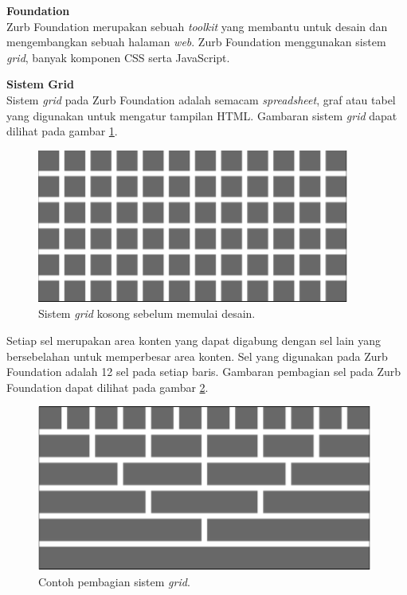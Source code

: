 \documentclass[a4paper,twoside]{article}
\begin{document}
\begin{enumerate}
\begin{lstlisting}[caption=Menambahkan vektor pada peta,label = {lst_2_ol_map},language=Java]
\end{lstlisting}

\textbf{Foundation}\\

Zurb Foundation \cite{zurbfoundationbook} merupakan sebuah \textit{toolkit} yang membantu untuk desain dan mengembangkan sebuah halaman \textit{web}. Zurb Foundation menggunakan sistem \textit{grid}, banyak komponen CSS serta JavaScript. 

\textbf{Sistem Grid}\\
Sistem \textit{grid} pada Zurb Foundation adalah semacam \textit{spreadsheet}, graf atau tabel yang digunakan untuk mengatur tampilan HTML. Gambaran sistem \textit{grid} dapat dilihat pada gambar \ref{fig:2_zurb_grid_blank}.

\begin{figure}[H]
	\centering
	\includegraphics[scale=0.5]{Gambar/zurb-gridblank}
	\caption{Sistem \textit{grid} kosong sebelum memulai desain.} 
	\label{fig:2_zurb_grid_blank}
\end{figure}

Setiap sel merupakan area konten yang dapat digabung dengan sel lain yang bersebelahan untuk memperbesar area konten. Sel yang digunakan pada Zurb Foundation adalah 12 sel pada setiap baris. Gambaran pembagian sel pada Zurb Foundation dapat dilihat pada gambar \ref{fig:2_zurb_grid}.

\begin{figure}[H]
	\centering
	\includegraphics[scale=0.5]{Gambar/zurb-grid}
	\caption{Contoh pembagian sistem \textit{grid}.} 
	\label{fig:2_zurb_grid}
\end{figure}


\end{enumerate}
\end{document}
